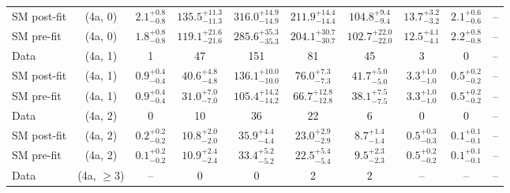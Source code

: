 \begin{table}[h!]
{\begin{tabular}{lccccccccc}
	SM post-fit & (4a, 0)           & $2.1^{+ 0.8 }_{- 0.8 }$        & $135.5^{+ 11.3 }_{- 11.3 }$    & $316.0^{+ 14.9 }_{- 14.9 }$ & $211.9^{+ 14.4 }_{- 14.4 }$ & $104.8^{+ 9.4 }_{- 9.4 }$   & $13.7^{+ 3.2 }_{- 3.2 }$ & $2.1^{+ 0.6 }_{- 0.6 }$  & --           \\[0.5ex] 
	SM pre-fit  & (4a, 0)           & $1.8^{+ 0.8 }_{- 0.8 }$        & $119.1^{+ 21.6 }_{- 21.6 }$    & $285.6^{+ 35.3 }_{- 35.3 }$ & $204.1^{+ 30.7 }_{- 30.7 }$ & $102.7^{+ 22.0 }_{- 22.0 }$ & $12.5^{+ 4.1 }_{- 4.1 }$ & $2.2^{+ 0.8 }_{- 0.8 }$  & --           \\[0.5ex] 
	Data        & (4a, 1)           & 1                              & 47                             & 151                         & 81                          & 45                          & 3                        & 0                        & --           \\[0.5ex] 
	SM post-fit & (4a, 1)           & $0.9^{+ 0.4 }_{- 0.4 }$        & $40.6^{+ 4.8 }_{- 4.8 }$       & $136.1^{+ 10.0 }_{- 10.0 }$ & $76.0^{+ 7.3 }_{- 7.3 }$    & $41.7^{+ 5.0 }_{- 5.0 }$    & $3.3^{+ 1.0 }_{- 1.0 }$  & $0.5^{+ 0.2 }_{- 0.2 }$  & --           \\[0.5ex] 
	SM pre-fit  & (4a, 1)           & $0.9^{+ 0.4 }_{- 0.4 }$        & $31.0^{+ 7.0 }_{- 7.0 }$       & $105.4^{+ 14.2 }_{- 14.2 }$ & $66.7^{+ 12.8 }_{- 12.8 }$  & $38.1^{+ 7.5 }_{- 7.5 }$    & $3.3^{+ 1.0 }_{- 1.0 }$  & $0.5^{+ 0.2 }_{- 0.2 }$  & --           \\[0.5ex] 
	Data        & (4a, 2)           & 0                              & 10                             & 36                          & 22                          & 6                           & 0                        & 0                        & --           \\[0.5ex] 
	SM post-fit & (4a, 2)           & $0.2^{+ 0.2 }_{- 0.2 }$        & $10.8^{+ 2.0 }_{- 2.0 }$       & $35.9^{+ 4.4 }_{- 4.4 }$    & $23.0^{+ 2.9 }_{- 2.9 }$    & $8.7^{+ 1.4 }_{- 1.4 }$     & $0.5^{+ 0.3 }_{- 0.3 }$  & $0.1^{+ 0.1 }_{- 0.1 }$  & --           \\[0.5ex] 
	SM pre-fit  & (4a, 2)           & $0.1^{+ 0.2 }_{- 0.2 }$        & $10.9^{+ 2.4 }_{- 2.4 }$       & $33.4^{+ 5.2 }_{- 5.2 }$    & $22.5^{+ 5.4 }_{- 5.4 }$    & $9.5^{+ 2.3 }_{- 2.3 }$     & $0.5^{+ 0.2 }_{- 0.2 }$  & $0.1^{+ 0.1 }_{- 0.1 }$  & --           \\[0.5ex] 
	Data        & (4a, $\ge3$)      & --                             & 0                              & 0                           & 2                           & 2                           & --                       & --                       & --           \\[0.5ex] 

\end{tabular}}
\end{table}
